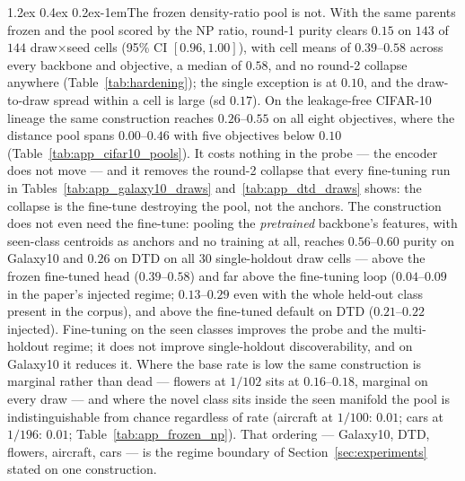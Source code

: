 \documentclass{article}
\makeatletter
\renewcommand\paragraph{\@startsection{paragraph}{4}{\z@}%
  {1.2ex \@plus 0.4ex \@minus 0.2ex}{-1em}{\normalsize\bf}}
\makeatother
\begin{document}
\paragraph{The frozen density-ratio pool is not.} With the same parents
frozen and the pool scored by the NP ratio, round-1 purity clears $0.15$ on
$143$ of $144$ draw$\times$seed cells (95\% CI $[0.96, 1.00]$), with cell
means of $0.39$--$0.58$ across every backbone and objective, a median of
$0.58$, and no round-2 collapse anywhere (Table~\ref{tab:hardening}); the
single exception is at $0.10$, and the draw-to-draw spread within a cell is
large (sd $0.17$). On the
leakage-free CIFAR-10 lineage the same construction reaches $0.26$--$0.55$ on
all eight objectives, where the distance pool spans $0.00$--$0.46$ with five
objectives below $0.10$ (Table~\ref{tab:app_cifar10_pools}). It costs nothing in the probe --- the
encoder does not move --- and it removes the round-2 collapse that every
fine-tuning run in Tables~\ref{tab:app_galaxy10_draws}
and~\ref{tab:app_dtd_draws} shows: the collapse is the fine-tune destroying
the pool, not the anchors. The construction does not even need the
fine-tune: pooling the \emph{pretrained} backbone's features, with
seen-class centroids as anchors and no training at all, reaches
$0.56$--$0.60$ purity on Galaxy10 and $0.26$ on DTD on all $30$
single-holdout draw cells --- above the frozen fine-tuned head
($0.39$--$0.58$) and far above the fine-tuning loop ($0.04$--$0.09$ in the
paper's injected regime; $0.13$--$0.29$ even with the whole held-out class
present in the corpus), and above the fine-tuned default on DTD
($0.21$--$0.22$ injected). Fine-tuning on the seen classes improves the probe
and the multi-holdout regime; it does not improve single-holdout
discoverability, and on Galaxy10 it reduces it. Where the base rate is low
the same construction is marginal rather than dead --- flowers at $1/102$
sits at $0.16$--$0.18$, marginal on every draw --- and where the
novel class sits inside the seen manifold the pool is indistinguishable
from chance regardless of rate
(aircraft at $1/100$: $0.01$; cars at $1/196$: $0.01$;
Table~\ref{tab:app_frozen_np}). That ordering --- Galaxy10, DTD, flowers,
aircraft, cars --- is the regime boundary of Section~\ref{sec:experiments}
stated on one construction.
\end{document}
